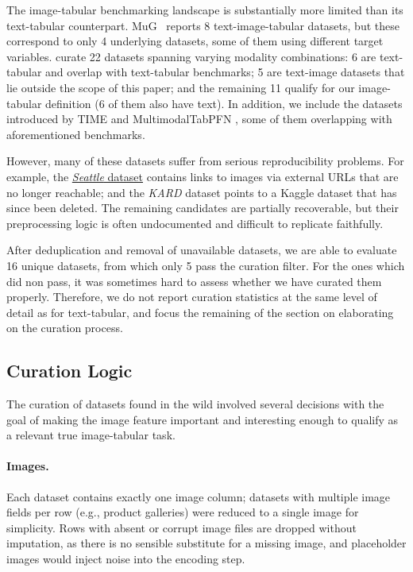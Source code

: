 The image-tabular benchmarking landscape is substantially more limited than its text-tabular counterpart. MuG~\cite{lu_mug_2023} reports 8 text-image-tabular datasets, but these correspond to only 4 underlying datasets, some of them using different target variables. \citet{tang_bag_2024} curate 22 datasets spanning varying modality combinations: 6 are text-tabular and overlap with text-tabular benchmarks; 5 are text-image datasets that lie outside the scope of this paper; and the remaining 11 qualify for our image-tabular definition (6 of them also have text). In addition, we include the datasets introduced by TIME \cite{luo_time_2025} and MultimodalTabPFN \cite{kim_multimodalpfn_2025}, some of them overlapping with aforementioned benchmarks. 

However, many of these datasets suffer from serious reproducibility problems. For example, the \href{https://www.kaggle.com/datasets/airbnb/seattle}{\textit{Seattle} dataset} contains links to images via external URLs that are no longer reachable; and the \textit{KARD} dataset points to a Kaggle dataset that has since been deleted. The remaining candidates are partially recoverable, but their preprocessing logic is often undocumented and difficult to replicate faithfully. 

After deduplication and removal of unavailable datasets, we are able to evaluate 16 unique datasets, from which only 5 pass the curation filter. For the ones which did non pass, it was sometimes hard to assess whether we have curated them properly. Therefore, we do not report curation statistics at the same level of detail as for text-tabular, and focus the remaining of the section on elaborating on the curation process.

\subsection{Curation Logic}

The curation of datasets found in the wild involved several decisions with the goal of making the image feature important and interesting enough to qualify as a relevant true image-tabular task.

\paragraph{Images.}
Each dataset contains exactly one image column; datasets with multiple image fields per row (e.g., product galleries) were reduced to a single image for simplicity. Rows with absent or corrupt image files are dropped without imputation, as there is no sensible substitute for a missing image, and placeholder images would inject noise into the encoding step.

